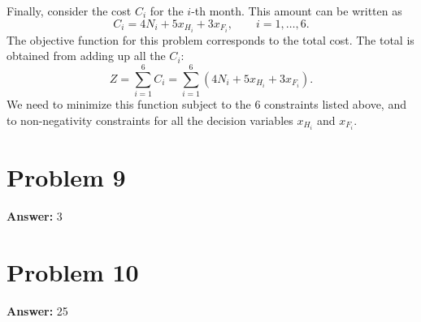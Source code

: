 \documentclass[11pt]{article}
\begin{document}
Finally, consider the cost \(C_i\) for the \(i\)-th month. This amount can
be written as
\begin{equation}
C_i=4N_i+5x_{H_i}+3x_{F_i},\qquad i=1,\ldots,6.
\end{equation}
The objective function for this problem corresponds to the total cost. The total
is obtained from adding up all the \(C_i\):
\begin{equation}
Z=\sum_{i=1}^6 C_i=\sum_{i=1}^6(4N_i+5x_{H_i}+3x_{F_i}).
\end{equation}
We need to minimize this function subject to the 6 constraints listed above, and
to non-negativity constraints for all the decision variables \(x_{H_i}\) and
\(x_{F_i}\).
\section*{Problem 9}
\label{sec:orgb350e80}

\textbf{Answer:} 3
\section*{Problem 10}
\label{sec:org0f0c806}

\textbf{Answer:} 25
\end{document}

